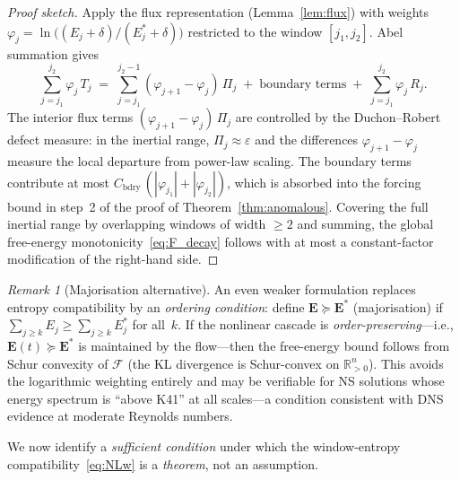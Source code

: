 \documentclass[12pt,a4paper]{article}
\theoremstyle{definition}
\theoremstyle{plain}
\theoremstyle{remark}
\newtheorem{remark}[definition]{Remark}
\begin{document}
\begin{proof}[Proof sketch]
Apply the flux representation (Lemma~\ref{lem:flux}) with weights
$\varphi_j = \ln\bigl((E_j+\delta)/(E_j^*+\delta)\bigr)$
restricted to the window $[j_1, j_2]$. Abel summation gives
\[
  \sum_{j=j_1}^{j_2} \varphi_j\,T_j
  \;=\;
  \sum_{j=j_1}^{j_2-1}
    (\varphi_{j+1} - \varphi_j)\,\Pi_j
  \;+\;
  \text{boundary terms}
  \;+\;
  \sum_{j=j_1}^{j_2} \varphi_j\,R_j.
\]
The interior flux terms $(\varphi_{j+1} - \varphi_j)\,\Pi_j$ are
controlled by the Duchon--Robert defect measure: in the inertial range,
$\Pi_j \approx \varepsilon$ and the differences $\varphi_{j+1}-\varphi_j$
measure the local departure from power-law scaling.
The boundary terms contribute at most
$C_{\mathrm{bdry}}\,(|\varphi_{j_1}|+|\varphi_{j_2}|)$, which is
absorbed into the forcing bound in step~2 of the proof of
Theorem~\ref{thm:anomalous}. Covering the full inertial range by
overlapping windows of width $\ge 2$ and summing, the global free-energy
monotonicity~\eqref{eq:F_decay} follows with at most a constant-factor
modification of the right-hand side.
\end{proof}

\begin{remark}[Majorisation alternative]
\label{rem:majorisation}
An even weaker formulation replaces entropy compatibility by an
\emph{ordering condition}: define $\mathbf{E} \succeq \mathbf{E}^*$
(majorisation) if $\sum_{j \ge k} E_j \ge \sum_{j \ge k} E_j^*$ for
all~$k$. If the nonlinear cascade is \emph{order-preserving}---i.e.,
$\mathbf{E}(t) \succeq \mathbf{E}^*$ is maintained by the
flow---then the free-energy bound follows from Schur convexity of
$\mathcal{F}$ (the KL divergence is Schur-convex on
$\mathbb{R}_{>0}^n$). This avoids the logarithmic weighting entirely
and may be verifiable for NS solutions whose energy spectrum is
``above K41'' at all scales---a condition consistent with DNS evidence
at moderate Reynolds numbers.
\end{remark}

We now identify a \emph{sufficient condition} under which the window-entropy
compatibility~\eqref{eq:NLw} is a \emph{theorem}, not an assumption.
\end{document}
